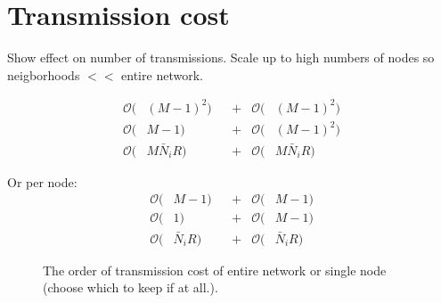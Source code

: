 \documentclass{article}
\begin{document}

\section{Transmission cost}
\label{sec:transcost}
Show effect on number of transmissions. Scale up to high numbers of nodes so neigborhoods \(<<\) entire network.

\begin{align}
  \mathcal{O}(&(M-1)^2) & &+ & \mathcal{O}(&(M-1)^2)\\
  \mathcal{O}(&M-1) & &+ & \mathcal{O}(&(M-1)^2)\\
  \mathcal{O}(&M \bar{N}_i R) & &+ & \mathcal{O}(&M \bar{N}_i R)
\end{align}

Or per node:
\begin{align}
  \mathcal{O}(&M-1) & &+ & \mathcal{O}(&M-1)\\
  \mathcal{O}(&1) & &+ & \mathcal{O}(&M-1)\\
  \mathcal{O}(&\bar{N}_i R) & &+ & \mathcal{O}(&\bar{N}_i R)
\end{align}

\begin{figure}
  \centering
  
  
  \vspace*{-0.8cm}
  \caption[]{The order of transmission cost of entire network or single node (choose which to keep if at all.).}
  \label{fig:transcost:bigo}
\end{figure}
\end{document}
